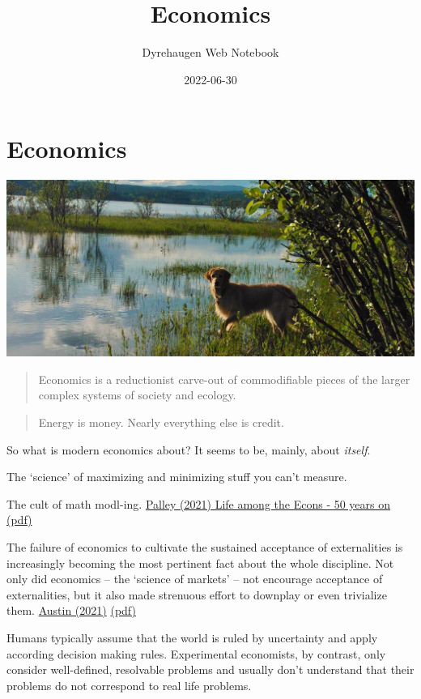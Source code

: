 \documentclass[
]{book}
\title{Economics}
\author{Dyrehaugen Web Notebook}
\date{2022-06-30}
\begin{document}
\maketitle

{
\setcounter{tocdepth}{1}
\tableofcontents
}
\hypertarget{economics}{%
\chapter{Economics}\label{economics}}

\includegraphics{fig/zelda.jpg}

\begin{quote}
Economics is a reductionist carve-out of commodifiable pieces of the larger complex systems of society and ecology.
\end{quote}

\begin{quote}
Energy is money. Nearly everything else is credit.
\end{quote}

So what is modern economics about? It seems to be, mainly, about \emph{itself}.

The `science' of maximizing and minimizing stuff you can't measure.

The cult of math modl-ing.
\href{pdf/Thomas_Palley_2106_Life_among_the_Econ_50yrs.pdf}{Palley (2021) Life among the Econs - 50 years on (pdf)}

The failure of economics to cultivate the sustained acceptance of externalities is increasingly
becoming the most pertinent fact about the whole discipline. Not only did economics -- the `science
of markets' -- not encourage acceptance of externalities, but it also made strenuous effort to
downplay or even trivialize them.
\href{https://bothbrainsrequire\%20d.com/2021/10/25/fix-that-fails/}{Austin (2021)}
\href{pdf/Austin_2021_Market_Led_Sustainability_Fix_Fails.pdf}{(pdf)}

Humans typically assume that the world is ruled by uncertainty and apply according decision making rules. Experimental economists, by contrast, only consider well-defined, resolvable problems and usually don't understand that their problems do not correspond to real life problems.
\end{document}
